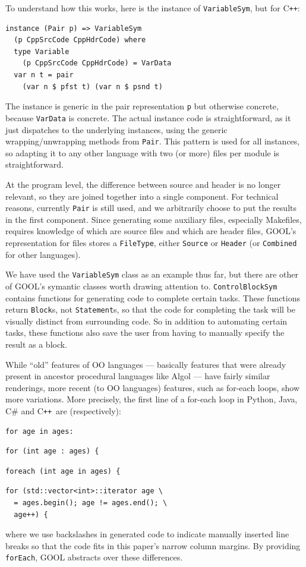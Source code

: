 \documentclass[sigplan,review,anonymous,prologue,dvipsnames]{acmart}
\newcommand{\Csharp}{C\#}
\newcommand{\Cplusplus}{C\texttt{++}}
\begin{document}
To understand how this works, here is the instance of \verb|VariableSym|,
but for \Cplusplus:
\begin{lstlisting}
instance (Pair p) => VariableSym 
  (p CppSrcCode CppHdrCode) where
  type Variable 
    (p CppSrcCode CppHdrCode) = VarData
  var n t = pair 
    (var n $ pfst t) (var n $ psnd t)
\end{lstlisting}
The instance is generic in the pair representation \verb|p| but
otherwise concrete, because \verb|VarData| is concrete. The actual
instance code is straightforward, as it just dispatches to the 
underlying instances, using the generic wrapping/unwrapping
methods from \verb|Pair|.  This pattern is used for all instances,
so adapting it to any other language with two (or more) files per
module is straightforward.

At the program level, the difference between source and header is no
longer relevant, so they are joined together into a single component.
For technical reasons, currently \verb|Pair| is still used, and we arbitrarily
choose to put the results in the first component. Since generating some 
auxiliary files, especially Makefiles, requires knowledge of which are source 
files and which are header files, GOOL's representation for files stores a 
\verb|FileType|, either \verb|Source| or \verb|Header| (or \verb|Combined| for 
other languages).

We have used the \verb|VariableSym| class as an example thus far, but there are 
other of GOOL's symantic classes worth drawing attention to. 
\verb|ControlBlockSym| contains functions for generating code to complete 
certain tasks. These functions return \verb|Block|s, not \verb|Statement|s, so 
that the code for completing the task will be visually distinct from 
surrounding code. So in addition to automating certain tasks, these functions 
also save the user from having to manually specify the result as a block.

While ``old'' features of OO languages --- basically features that
were already present in ancestor procedural languages like Algol ---
have fairly similar renderings, more recent (to OO languages) features,
such as for-each loops, show more variations.  More precisely,
the first line of a for-each loop in Python, Java, \Csharp{} and
\Cplusplus~are (respectively):
\begin{lstlisting}
for age in ages:
\end{lstlisting}
\begin{lstlisting}
for (int age : ages) {
\end{lstlisting}
\begin{lstlisting}
foreach (int age in ages) {
\end{lstlisting}
\begin{lstlisting}
for (std::vector<int>::iterator age \
  = ages.begin(); age != ages.end(); \
  age++) {
\end{lstlisting}
where we use backslashes in generated code to indicate manually inserted
line breaks so that the code fits in this paper's narrow column margins. By 
providing \verb|forEach|, GOOL abstracts over these differences.
\end{document}
